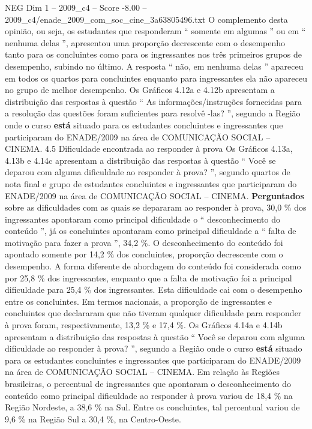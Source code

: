 \begin{textsample}{NEG Dim 1 – 2009\_c4 – Score -8.00 – 2009\_c4/enade\_2009\_com\_soc\_cine\_3a63805496.txt}
O complemento desta opinião, ou seja, os estudantes que responderam “ somente em algumas ” ou em “ nenhuma delas ”, apresentou uma proporção decrescente com o desempenho tanto para os concluintes como para os ingressantes nos três primeiros grupos de desempenho, subindo no último.
A resposta “ não, em nenhuma delas ” apareceu em todos os quartos para concluintes enquanto para ingressantes ela não apareceu no grupo de melhor desempenho.
Os Gráficos 4.12a e 4.12b apresentam a distribuição das respostas à questão “ As informações/instruções fornecidas para a resolução das questões foram suficientes para resolvê -las? ”, segundo a Região onde o curso \textbf{está} situado para os estudantes concluintes e ingressantes que participaram do ENADE/2009 na área de COMUNICAÇÃO SOCIAL – CINEMA. 4.5 Dificuldade encontrada ao responder à prova Os Gráficos 4.13a, 4.13b e 4.14c apresentam a distribuição das respostas à questão “ Você se deparou com alguma dificuldade ao responder à prova? ”, segundo quartos de nota final e grupo de estudantes concluintes e ingressantes que participaram do ENADE/2009 na área de COMUNICAÇÃO SOCIAL – CINEMA. \textbf{Perguntados} sobre as dificuldades com as quais se depararam ao responder à prova, 30,0 \% dos ingressantes apontaram como principal dificuldade o “ desconhecimento do conteúdo ”, já os concluintes apontaram como principal dificuldade a “ falta de motivação para fazer a prova ”, 34,2 \%.
O desconhecimento do conteúdo foi apontado somente por 14,2 \% dos concluintes, proporção decrescente com o desempenho.
A forma diferente de abordagem do conteúdo foi considerada como por 25,8 \% dos ingressantes, enquanto que a falta de motivação foi a principal dificuldade para 25,4 \% dos ingressantes.
Esta dificuldade cai com o desempenho entre os concluintes.
Em termos nacionais, a proporção de ingressantes e concluintes que declararam que não tiveram qualquer dificuldade para responder à prova foram, respectivamente, 13,2 \% e 17,4 \%.
Os Gráficos 4.14a e 4.14b apresentam a distribuição das respostas à questão “ Você se deparou com alguma dificuldade ao responder à prova? ”, segundo a Região onde o curso \textbf{está} situado para os estudantes concluintes e ingressantes que participaram do ENADE/2009 na área de COMUNICAÇÃO SOCIAL – CINEMA.
Em relação às Regiões brasileiras, o percentual de ingressantes que apontaram o desconhecimento do conteúdo como principal dificuldade ao responder à prova variou de 18,4 \% na Região Nordeste, a 38,6 \% na Sul.
Entre os concluintes, tal percentual variou de 9,6 \% na Região Sul a 30,4 \%, na Centro-Oeste.

\end{textsample}
